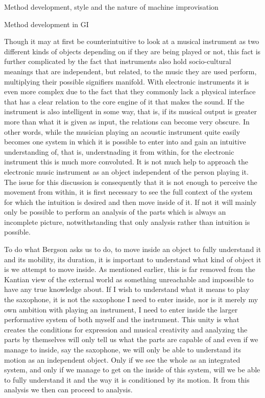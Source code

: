 \documentclass[presentation]{beamer}
\begin{document}
\begin{frame}[label={sec:org08c5441}]{Method development, style and the nature of machine improvisation}
\begin{block}{Method development in GI}
{{Though it may at first be counterintuitive to look at a musical instrument as two different kinds of objects depending on if they are being played or not, this fact is further complicated by the fact that instruments also hold socio-cultural meanings that are independent, but related, to the music they are used perform, multiplying their possible signifiers manifold. With electronic instruments it is even more complex due to the fact that they commonly lack a physical interface that has a clear relation to the core engine of it that makes the sound. If the instrument is also intelligent in some way, that is, if its musical output is greater more than what it is given as input, the relations can become very obscure. In other words, while the musician playing an acoustic instrument quite easily becomes one system in which it is possible to enter into and gain an intuitive understanding of, that is, understnading it from within, for the electronic instrument this is much more convoluted. It is not much help to approach the electronic music instrument as an object independent of the person playing it. The issue for this discussion is consequently that it is not enough to perceive the movement from within, it is first necessary to see the full context of the system for which the intuition is desired and then move inside of it. If not it will mainly only be possible to perform an analysis of the parts which is always an incomplete picture, notwithstanding that only analysis rather than intuition is possible.

To do what Bergson asks us to do, to move inside an object to fully understand it and its mobility, its duration, it is important to understand what kind of object it is we attempt to move inside. As mentioned earlier, this is far removed from the Kantian view of the external world as something unreachable and impossible to have any true knowledge about. If I wish to understand what it means to play the saxophone, it is not the saxophone I need to enter inside, nor is it merely my own ambition with playing an instrument, I need to enter inside the larger performative system of both myself and the instrument. This unity is what creates the conditions for expression and musical creativity and analyzing the parts by themselves will only tell us what the parts are capable of and even if we manage to inside, say the saxophone, we will only be able to understand its motion as an independent object. Only if we see the whole as an integrated system, and only if we manage to get on the inside of this system, will we be able to fully understand it and the way it is conditioned by its motion. It from this analysis we then can proceed to analysis.

}}
\end{block}
\end{frame}
\end{document}
